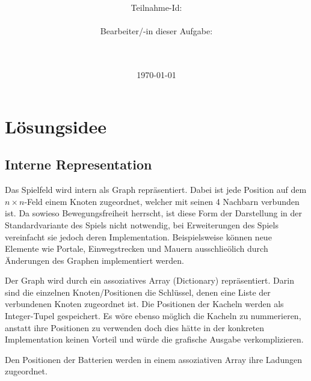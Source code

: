 \documentclass[a4paper,10pt,ngerman]{scrartcl}
\title{\textbf{\Huge\Aufgabe}}
\author{\LARGE Teilnahme-Id: \LARGE \TeilnahmeId \\\\
	    \LARGE Bearbeiter/-in dieser Aufgabe: \\
	    \LARGE \Namen\\\\}
\date{\LARGE\today}
\begin{document}
\maketitle
\tableofcontents

\vspace{0.5cm}

\section{Lösungsidee}

\subsection{Interne Representation}
Das Spielfeld wird intern als Graph repräsentiert. Dabei ist jede Position auf dem \(n\times n\)-Feld einem Knoten zugeordnet, welcher mit seinen 4 Nachbarn verbunden ist. Da sowieso Bewegungsfreiheit herrscht, ist diese Form der Darstellung in der Standardvariante des Spiels nicht notwendig, bei Erweiterungen des Spiels vereinfacht sie jedoch deren Implementation. Beispielsweise können neue Elemente wie Portale, Einwegstrecken und Mauern ausschlieölich durch Änderungen des Graphen implementiert werden.

Der Graph wird durch ein assoziatives Array (Dictionary) repräsentiert. Darin sind die einzelnen Knoten/Positionen die Schlüssel, denen eine Liste der verbundenen Knoten zugeordnet ist. Die Positionen der Kacheln werden als Integer-Tupel gespeichert. Es wöre ebenso möglich die Kacheln zu nummerieren, anstatt ihre Positionen zu verwenden doch dies hätte in der konkreten Implementation keinen Vorteil und würde die grafische Ausgabe verkomplizieren.

Den Positionen der Batterien werden in einem assoziativen Array ihre Ladungen zugeordnet.
\end{document}
